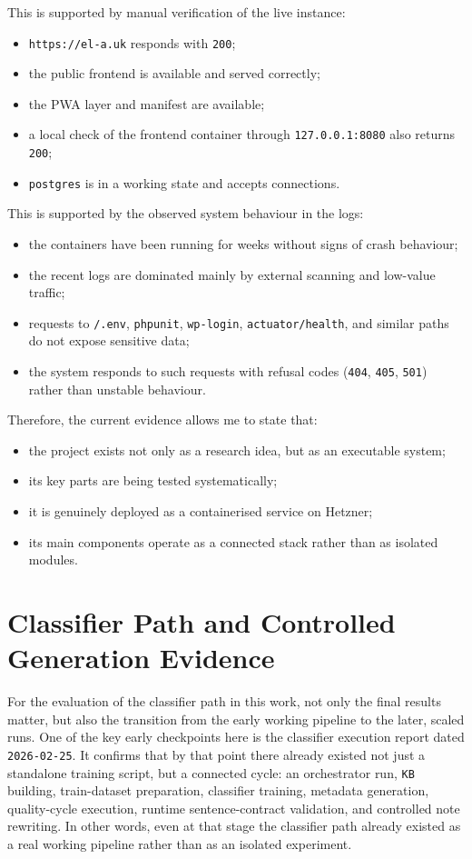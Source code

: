 \documentclass[12pt,a4paper,oneside]{report}
\begin{document}
This is supported by manual verification of the live instance:
\begin{itemize}
  \item \texttt{https://el-a.uk} responds with \texttt{200};
  \item the public frontend is available and served correctly;
  \item the PWA layer and manifest are available;
  \item a local check of the frontend container through \texttt{127.0.0.1:8080} also returns \texttt{200};
  \item \texttt{postgres} is in a working state and accepts connections.
\end{itemize}

This is supported by the observed system behaviour in the logs:
\begin{itemize}
  \item the containers have been running for weeks without signs of crash behaviour;
  \item the recent logs are dominated mainly by external scanning and low-value traffic;
  \item requests to \texttt{/.env}, \texttt{phpunit}, \texttt{wp-login}, \texttt{actuator/health}, and similar paths do not expose sensitive data;
  \item the system responds to such requests with refusal codes (\texttt{404}, \texttt{405}, \texttt{501}) rather than unstable behaviour.
\end{itemize}

Therefore, the current evidence allows me to state that:
\begin{itemize}
  \item the project exists not only as a research idea, but as an executable system;
  \item its key parts are being tested systematically;
  \item it is genuinely deployed as a containerised service on Hetzner;
  \item its main components operate as a connected stack rather than as isolated modules.
\end{itemize}

\section{Classifier Path and Controlled Generation Evidence}
For the evaluation of the classifier path in this work, not only the final results matter, but also the transition from the early working pipeline to the later, scaled runs. One of the key early checkpoints here is the classifier execution report dated \texttt{2026-02-25}. It confirms that by that point there already existed not just a standalone training script, but a connected cycle: an orchestrator run, \texttt{KB} building, train-dataset preparation, classifier training, metadata generation, quality-cycle execution, runtime sentence-contract validation, and controlled note rewriting. In other words, even at that stage the classifier path already existed as a real working pipeline rather than as an isolated experiment.
\end{document}
